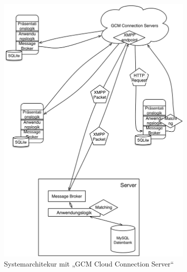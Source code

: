 \begin{figure}[H]
	\centering
	\includegraphics[width=0.85\textwidth]{./images/architekturneu.png}
	\caption{Systemarchitekur mit „GCM Cloud Connection Server“}
	\label{fg:gcmccsarchitecture}
\end{figure}
